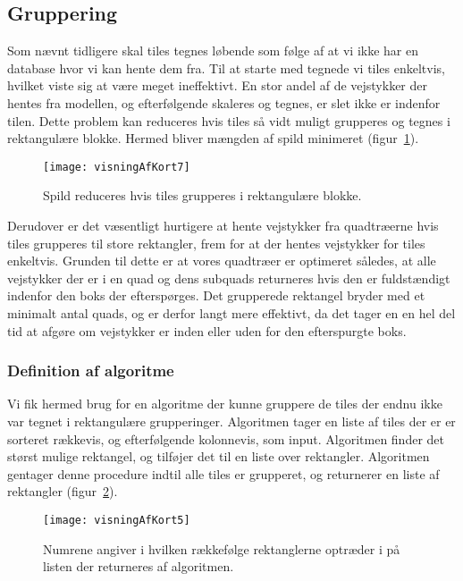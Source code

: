 \subsection{Gruppering}
\label{subsec:gruppering}

Som nævnt tidligere skal tiles tegnes løbende som følge af at vi ikke har en database hvor vi kan hente dem fra. Til at starte med tegnede vi tiles enkeltvis, hvilket viste sig at være meget ineffektivt. En stor andel af de vejstykker der hentes fra modellen, og efterfølgende skaleres og tegnes, er slet ikke er indenfor tilen. Dette problem kan reduceres hvis tiles så vidt muligt grupperes og tegnes i rektangulære blokke. Hermed bliver mængden af spild minimeret (figur~\ref{figur:visningAfKort7}).

\begin{figure}[h]
	\centering
	\texttt{[image: visningAfKort7]}
	\captionsetup{width=0.8\textwidth}
	\caption{Spild reduceres hvis tiles grupperes i rektangulære blokke.}
	\label{figur:visningAfKort7}
\end{figure}

Derudover er det væsentligt hurtigere at hente vejstykker fra quadtræerne hvis tiles grupperes til store rektangler, frem for at der hentes vejstykker for tiles enkeltvis. Grunden til dette er at vores quadtræer er optimeret således, at alle vejstykker der er i en quad og dens subquads returneres hvis den er fuldstændigt indenfor den boks der efterspørges. Det grupperede rektangel bryder med et minimalt antal quads, og er derfor langt mere effektivt, da det tager en en hel del tid at afgøre om vejstykker er inden eller uden for den efterspurgte boks.

\subsubsection{Definition af algoritme}
\label{subsec:definitionAfAlgoritme}

Vi fik hermed brug for en algoritme der kunne gruppere de tiles der endnu ikke var tegnet i rektangulære grupperinger. Algoritmen tager en liste af tiles der er er sorteret rækkevis, og efterfølgende kolonnevis, som input. Algoritmen finder det størst mulige rektangel, og tilføjer det til en liste over rektangler. Algoritmen gentager denne procedure indtil alle tiles er grupperet, og returnerer en liste af rektangler (figur~\ref{figur:visningAfKort5}).

\begin{figure}[h]
	\centering
	\texttt{[image: visningAfKort5]}
	\captionsetup{width=0.8\textwidth}
	\caption{Numrene angiver i hvilken rækkefølge rektanglerne optræder i på listen der returneres af algoritmen.}
	\label{figur:visningAfKort5}
\end{figure}

